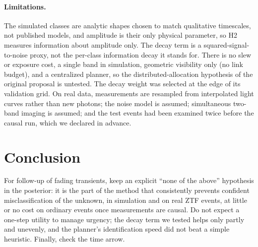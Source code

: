 \paragraph{Limitations.} The simulated classes are analytic shapes chosen to match qualitative timescales, not published models, and amplitude is their only physical parameter, so H2 measures information about amplitude only. The decay term is a squared-signal-to-noise proxy, not the per-class information decay it stands for. There is no slew or exposure cost, a single band in simulation, geometric visibility only (no link budget), and a centralized planner, so the distributed-allocation hypothesis of the original proposal is untested. The decay weight was selected at the edge of its validation grid. On real data, measurements are resampled from interpolated light curves rather than new photons; the noise model is assumed; simultaneous two-band imaging is assumed; and the test events had been examined twice before the causal run, which we declared in advance.

\section{Conclusion}
For follow-up of fading transients, keep an explicit ``none of the above'' hypothesis in the posterior: it is the part of the method that consistently prevents confident misclassification of the unknown, in simulation and on real ZTF events, at little or no cost on ordinary events once measurements are causal. Do not expect a one-step utility to manage urgency; the decay term we tested helps only partly and unevenly, and the planner's identification speed did not beat a simple heuristic. Finally, check the time arrow.
